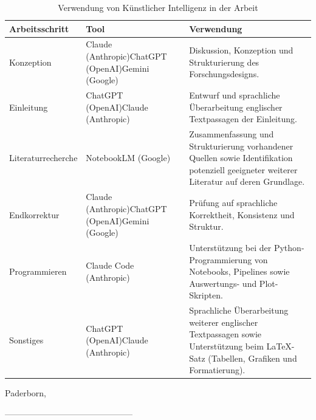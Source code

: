 
\bigskip

\begin{table}[h]
\centering
\begin{tabular}{|>{\raggedright\arraybackslash}m{3.5cm}|>{\raggedright\arraybackslash}m{4cm}|>{\raggedright\arraybackslash}m{6.5cm}|}
\hline
\centering\textbf{Arbeitsschritt}\arraybackslash &
\centering\textbf{Tool}\arraybackslash &
\centering\textbf{Verwendung}\arraybackslash \\
\hline
Konzeption & Claude (Anthropic)\newline ChatGPT (OpenAI)\newline Gemini (Google) & Diskussion, Konzeption und Strukturierung des Forschungsdesigns.\\
\hline
Einleitung & ChatGPT (OpenAI)\newline Claude (Anthropic) & Entwurf und sprachliche Überarbeitung englischer Textpassagen der Einleitung.\\
\hline
Literaturrecherche & NotebookLM (Google) & Zusammenfassung und Strukturierung vorhandener Quellen sowie Identifikation potenziell geeigneter weiterer Literatur auf deren Grundlage. \\
\hline
Endkorrektur & Claude (Anthropic)\newline ChatGPT (OpenAI)\newline Gemini (Google) & Prüfung auf sprachliche Korrektheit, Konsistenz und Struktur.\\
\hline
Programmieren & Claude Code (Anthropic) & Unterstützung bei der Python-Programmierung von Notebooks, Pipelines sowie Auswertungs- und Plot-Skripten. \\
\hline
Sonstiges & ChatGPT (OpenAI)\newline Claude (Anthropic) & Sprachliche Überarbeitung weiterer englischer Textpassagen sowie Unterstützung beim LaTeX-Satz (Tabellen, Grafiken und Formatierung).\\
\hline
\end{tabular}
\caption{Verwendung von Künstlicher Intelligenz in der Arbeit}
\label{tab:ki_nutzung}
\end{table}

\bigskip

Paderborn, \abgabedatum

\begin{flushright}
\bigskip
\bigskip
\bigskip

---------------------------------------------\\
\name
\end{flushright}



\bigskip
